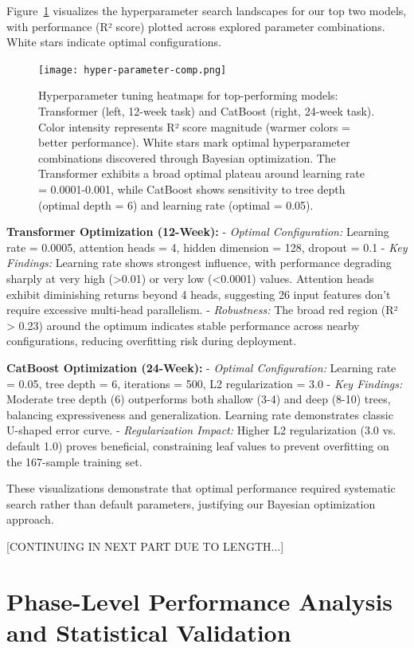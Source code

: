 \documentclass[conference]{IEEEtran}
\begin{document}
Figure~\ref{fig:hyper_param_tuned} visualizes the hyperparameter search landscapes for our top two models, with performance (R² score) plotted across explored parameter combinations. White stars indicate optimal configurations.

\begin{figure}[h]
    \centering
    \texttt{[image: hyper-parameter-comp.png]}
    \caption{Hyperparameter tuning heatmaps for top-performing models: Transformer (left, 12-week task) and CatBoost (right, 24-week task). Color intensity represents R² score magnitude (warmer colors = better performance). White stars mark optimal hyperparameter combinations discovered through Bayesian optimization. The Transformer exhibits a broad optimal plateau around learning rate = 0.0001-0.001, while CatBoost shows sensitivity to tree depth (optimal depth = 6) and learning rate (optimal = 0.05).}
    \label{fig:hyper_param_tuned}
\end{figure}

\textbf{Transformer Optimization (12-Week):}
- \textit{Optimal Configuration:} Learning rate = 0.0005, attention heads = 4, hidden dimension = 128, dropout = 0.1
- \textit{Key Findings:} Learning rate shows strongest influence, with performance degrading sharply at very high (>0.01) or very low (<0.0001) values. Attention heads exhibit diminishing returns beyond 4 heads, suggesting 26 input features don't require excessive multi-head parallelism.
- \textit{Robustness:} The broad red region (R² > 0.23) around the optimum indicates stable performance across nearby configurations, reducing overfitting risk during deployment.

\textbf{CatBoost Optimization (24-Week):}
- \textit{Optimal Configuration:} Learning rate = 0.05, tree depth = 6, iterations = 500, L2 regularization = 3.0
- \textit{Key Findings:} Moderate tree depth (6) outperforms both shallow (3-4) and deep (8-10) trees, balancing expressiveness and generalization. Learning rate demonstrates classic U-shaped error curve.
- \textit{Regularization Impact:} Higher L2 regularization (3.0 vs. default 1.0) proves beneficial, constraining leaf values to prevent overfitting on the 167-sample training set.

These visualizations demonstrate that optimal performance required systematic search rather than default parameters, justifying our Bayesian optimization approach.

[CONTINUING IN NEXT PART DUE TO LENGTH...]

\section{Phase-Level Performance Analysis and Statistical Validation}
\end{document}
